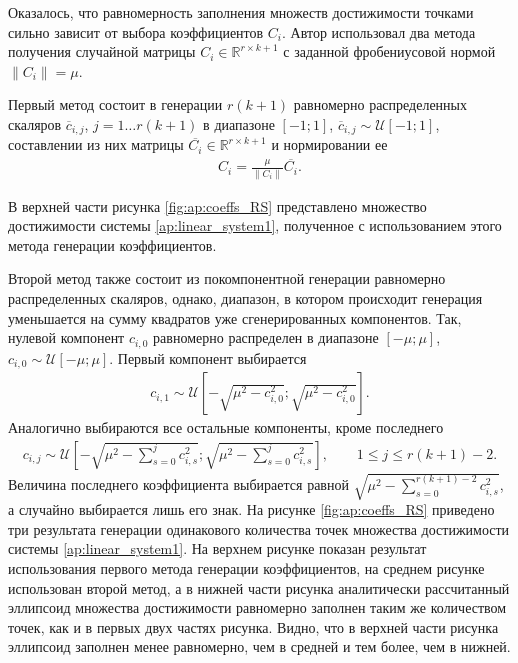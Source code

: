 \documentclass[../main.tex]{subfiles}
\begin{document}
 Оказалось, что равномерность заполнения множеств достижимости точками сильно зависит от выбора коэффициентов $C_i$. 
 Автор использовал два метода получения случайной матрицы $C_i \in \mathbb{R}^{r \times k+1}$ с заданной фробениусовой нормой $ \|C_i\| = \mu$. 
 
 Первый метод состоит в генерации $r (k + 1)$ равномерно распределенных скаляров $ \overline{c}_{i, j}$, $ j = 1\dots r (k + 1)$ в диапазоне $[-1;1] $, $\overline{c}_{i, j} \sim \mathcal{U}[-1;1]$, составлении из них матрицы $\overline{C_i} \in \mathbb{R}^{r \times k+1}$ и нормировании ее
 \begin{gather*}
 		C_i = \frac{\mu}{\|C_i\|}\overline{C_i}.
 \end{gather*}
 
 В верхней части рисунка \ref{fig:ap:coeffs_RS} представлено множество достижимости системы \eqref{ap:linear_system1}, полученное с использованием этого метода генерации коэффициентов. 
 
 Второй метод также состоит из покомпонентной генерации равномерно распределенных скаляров, однако, диапазон, в котором происходит генерация уменьшается на сумму квадратов уже сгенерированных компонентов. 
 Так, нулевой компонент $c_{i, 0}$ равномерно распределен в диапазоне $[-\mu; \mu]$, $c_{i, 0} \sim \mathcal{U}[-\mu; \mu]$. 
 Первый компонент выбирается 
 \begin{gather*}
 	 c_{i, 1} \sim \mathcal{U}\left[-\sqrt{\mu^2 - c_{i, 0}^2}; \sqrt{\mu^2 - c_{i, 0}^2}\right].
 \end{gather*} 
 Аналогично выбираются все остальные компоненты, кроме последнего
 \begin{gather*}
 	c_{i, j} \sim \mathcal{U}\left[-\sqrt{\mu^2 - \sum\limits_{s = 0}^j c_{i, s}^2}; \sqrt{\mu^2 - \sum\limits_{s = 0}^j c_{i, s}^2}\right], \qquad 1 \leqslant j \leqslant r(k+1) - 2.
 \end{gather*} 
 Величина последнего коэффициента выбирается равной $\sqrt{\mu^2 - \sum\limits_{s = 0}^{r(k+1) - 2} c_{i, s}^2} $, а случайно выбирается лишь его знак.
 На рисунке \ref{fig:ap:coeffs_RS} приведено три результата генерации одинакового количества точек множества достижимости системы \eqref{ap:linear_system1}.
 На верхнем рисунке показан результат использования первого метода генерации коэффициентов, на среднем рисунке использован второй метод, а в нижней части рисунка аналитически рассчитанный эллипсоид множества достижимости равномерно заполнен таким же количеством точек, как и в первых двух частях рисунка. 
 Видно, что в верхней части рисунка эллипсоид заполнен менее равномерно, чем в средней и тем более, чем в нижней. 
 
\end{document}
